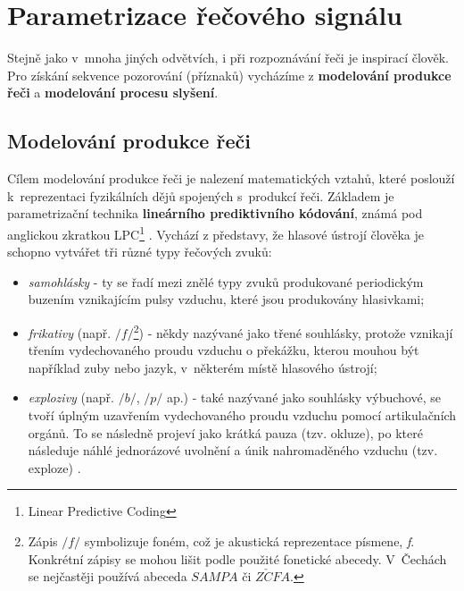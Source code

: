 \section{Parametrizace řečového signálu}
\label{chap:asr:parametrization}

Stejně jako v~mnoha jiných odvětvích, i při rozpoznávání řeči je inspirací člověk. Pro získání sekvence pozorování (příznaků) vycházíme z \textbf{modelování produkce řeči} a \textbf{modelování procesu slyšení}.

\subsection{Modelování produkce řeči}
\label{chap:asr:parametrization:production}

Cílem modelování produkce řeči je nalezení matematických vztahů, které poslouží k~reprezentaci fyzikálních dějů spojených s~produkcí řeči. Základem je parametrizační technika \textbf{lineárního prediktivního kódování}, známá pod anglickou zkratkou LPC\footnote{Linear Predictive Coding} \cite{Benesty2007}. Vychází z představy, že hlasové ústrojí člověka je schopno vytvářet tři různé typy řečových zvuků:

\begin{itemize}
  \item \textit{samohlásky} - ty se řadí mezi znělé typy zvuků produkované periodickým buzením vznikajícím pulsy vzduchu, které jsou produkovány hlasivkami;
  \item \textit{frikativy} (např. $/f/$\footnote{Zápis $/f/$ symbolizuje foném, což je akustická reprezentace písmene, \textit{f}. Konkrétní zápisy se mohou lišit podle použité fonetické abecedy. V~Čechách se nejčastěji používá abeceda $SAMPA$ či $Z\check{C}FA$.}) - někdy nazývané jako třené souhlásky, protože vznikají třením vydechovaného proudu vzduchu o překážku, kterou mouhou být například zuby nebo jazyk, v~některém místě hlasového ústrojí;
  \item \textit{explozivy} (např. $/b/$, $/p/$ ap.) - také nazývané jako souhlásky výbuchové, se tvoří úplným uzavřením vydechovaného proudu vzduchu pomocí artikulačních orgánů. To se následně projeví jako krátká pauza (tzv. okluze), po které následuje náhlé jednorázové uvolnění a únik nahromaděného vzduchu (tzv. exploze) \cite{Psutka2006}.
\end{itemize}


